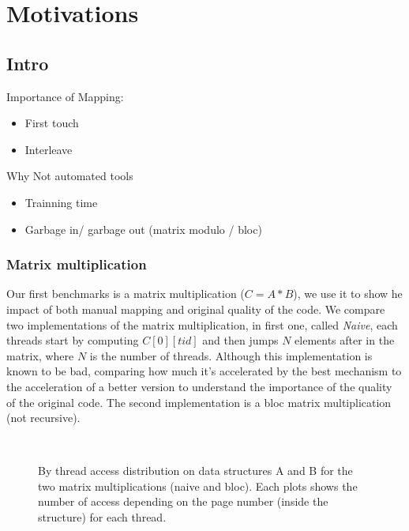 \section{Motivations}
\label{sec:motivations}

\subsection{Intro}
\label{sec:motivations-intro}

Importance of Mapping:
\begin{itemize}
    \item First touch
    \item Interleave
\end{itemize}

Why Not automated tools
\begin{itemize}
    \item Trainning time
    \item Garbage in/ garbage out (matrix modulo / bloc)
\end{itemize}
\subsubsection{Matrix multiplication}


Our first benchmarks is a matrix multiplication ($C=A*B$), we use it to show he
impact of both manual mapping and original quality of the code. We compare two
implementations of the matrix multiplication, in first one, called
\emph{Naive}, each threads start by computing $C[0][tid]$ and then jumps $N$
elements after in the matrix, where $N$ is the number of threads. Although
this implementation is known to be bad, comparing how much it's accelerated by
the best mechanism to the acceleration of a better version to understand the
importance of the quality of the original code.  The
second implementation is a bloc matrix multiplication (not recursive).

\begin{figure}[htb]
    \centering
    \\
    \caption{By thread access distribution on data structures A and B for the
    two matrix multiplications (naive and bloc). Each plots shows the number of access
depending on the page number (inside the structure) for each thread.}
    \label{fig:matrix-behaviour}
\end{figure}

